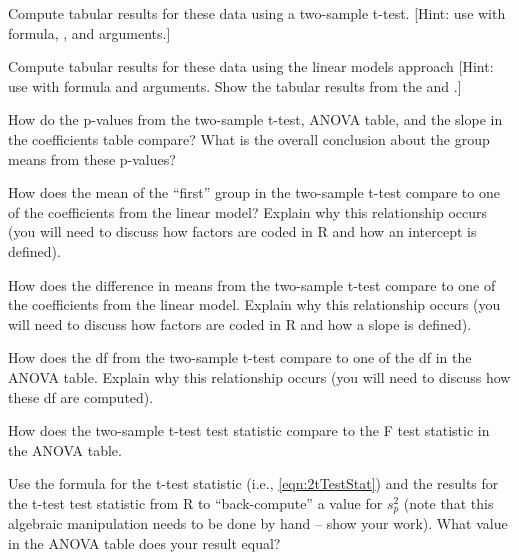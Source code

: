 \documentclass[10pt,openany]{book}\usepackage[]{graphicx}\usepackage[]{color}
\begin{document}
\begin{hwsection}
    \begin{Enumerate}
      \item Compute tabular results for these data using a two-sample t-test. [Hint: use  with formula, , and  arguments.]
      \item Compute tabular results for these data using the linear models approach [Hint: use  with formula and  arguments.  Show the tabular results from the  and .]
      \item How do the p-values from the two-sample t-test, ANOVA table, and the slope in the coefficients table compare?  What is the overall conclusion about the group means from these p-values?
      \item How does the mean of the ``first'' group in the two-sample t-test compare to one of the coefficients from the linear model?  Explain why this relationship occurs (you will need to discuss how factors are coded in R and how an intercept is defined).
      \item How does the difference in means from the two-sample t-test compare to one of the coefficients from the linear model.  Explain why this relationship occurs (you will need to discuss how factors are coded in R and how a slope is defined).
      \item How does the df from the two-sample t-test compare to one of the df in the ANOVA table.  Explain why this relationship occurs (you will need to discuss how these df are computed).
      \item How does the two-sample t-test test statistic compare to the F test statistic in the ANOVA table.
      \item Use the formula for the t-test statistic (i.e., \ref{eqn:2tTestStat}) and the results for the t-test test statistic from R to ``back-compute'' a value for $s_{p}^{2}$ (note that this algebraic manipulation needs to be done by hand -- show your work).  What value in the ANOVA table does your result equal?
    \end{Enumerate}

\end{hwsection}
\end{document}
